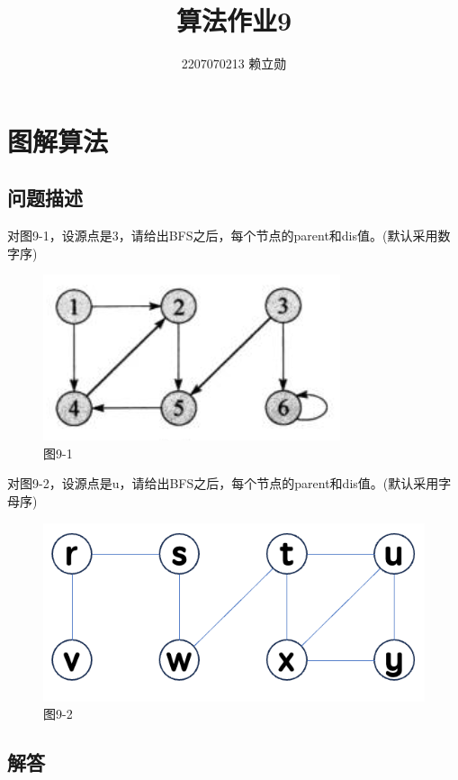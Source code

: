 \documentclass{article}
\begin{document}
\title{算法作业9}
\author{2207070213 赖立勋} %
\maketitle

\section{}

\section{图解算法}

\subsection{问题描述}

对图9-1，设源点是3，请给出BFS之后，每个节点的parent和dis值。(默认采用数字序)

\begin{figure}[h]
    \centering
    \includegraphics[width=0.5\linewidth]{Figure/9-1.png}
    \caption{图9-1}
    \label{fig:9-1 raw}
\end{figure}

对图9-2，设源点是u，请给出BFS之后，每个节点的parent和dis值。(默认采用字母序)

\begin{figure}[h]
    \centering
    \includegraphics[width=0.5\linewidth]{Figure/9-2.png}
    \caption{图9-2}
    \label{fig:9-2 raw}
\end{figure}

\pagebreak

\subsection{解答}
\end{document}
